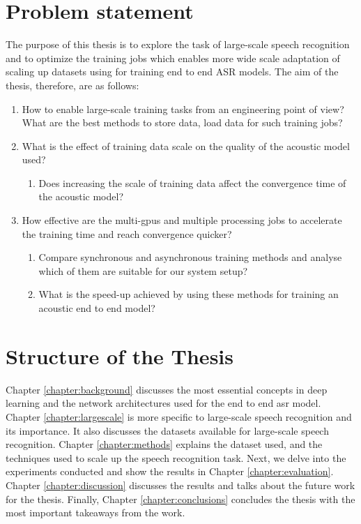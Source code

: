 \section{Problem statement}
The purpose of this thesis is to explore the task of large-scale speech recognition and to optimize the training jobs which enables more wide scale adaptation of scaling up datasets using for training end to end ASR models. The aim of the thesis, therefore, are as follows:

\begin{enumerate}
  \item How to enable large-scale training tasks from an engineering point of view? What are the best  methods  to  store data, load data for such training jobs?
  \item What is the effect of training data scale on the quality of the acoustic model used?
    \begin{enumerate}
        \item Does increasing the scale of training data affect the convergence time of the acoustic model?
    \end{enumerate}
  \item How effective are the multi-\acrshort{gpu}s and multiple processing jobs to accelerate the training time and reach convergence quicker? 
    \begin{enumerate}
        \item Compare synchronous and asynchronous training methods and analyse which of them are suitable for our system setup? 
        \item What is the speed-up achieved by using these methods for training an acoustic end to end model?
    \end{enumerate}
\end{enumerate}




\section{Structure of the Thesis}
\label{section:structure} 
Chapter \ref{chapter:background} discusses the most essential concepts in deep learning and the network architectures used for the end to end \acrshort{asr} model. Chapter \ref{chapter:largescale} is more specific to large-scale speech recognition and its importance. It also discusses the datasets available for large-scale speech recognition. Chapter \ref{chapter:methods} explains the dataset used, and the techniques used to scale up the speech recognition task. Next, we delve into the experiments conducted and show the results in Chapter \ref{chapter:evaluation}. Chapter \ref{chapter:discussion} discusses the results and  talks about the future work for the thesis. Finally, Chapter \ref{chapter:conclusions} concludes the thesis with the most important takeaways from the work.
